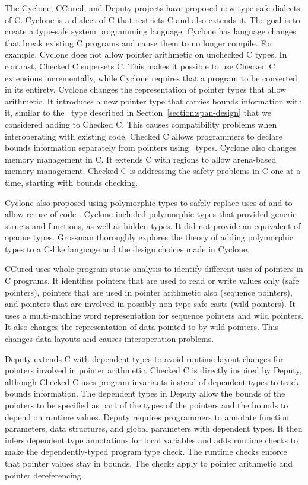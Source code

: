 The Cyclone, CCured, and Deputy projects have proposed new type-safe dialects 
of C.   Cyclone \cite{Jim2002} is a dialect of C that restricts C and also extends it.  The goal is to create a type-safe system programming
language.  Cyclone has language changes that break existing C programs and
cause them to no longer compile.  For example, Cyclone does not allow pointer
arithmetic on unchecked C types.   In contrast, Checked C supersets C. This
makes it possible to use Checked C extensions incrementally, while Cyclone
requires that a program to be converted in its entirety.  Cyclone changes the representation of pointer types that allow arithmetic.  It introduces a new 
pointer type that carries bounds information with it, similar to the \spanptr\
type described in Section~\ref{section:span-design} that we considered adding to Checked C.
This causes  compatibility problems when interoperating with existing
code.   Checked C allows programmers to declare bounds information separately from pointers using \arrayptr\ types.
Cyclone also changes memory management in C.  It extends C with regions
to allow arena-based memory management.  Checked C is addressing the
safety problems in C one at a time, starting with bounds checking. 

Cyclone also proposed using polymorphic types to safely replace 
uses of \uncheckedptrvoid{} and to allow re-use of code \cite{Grossman2006}.  Cyclone
included polymorphic types that provided generic structs and functions, as well as hidden types.  
It did not provide an equivalent of opaque types.  
Grossman \cite{Grossman2006} thoroughly explores the theory of adding polymorphic types
to a C-like language and the design choices made in Cyclone.

CCured \cite{Necula2005} uses whole-program static analysis to identify 
different uses of pointers in C programs. It identifies pointers that are used to
read or write values only (safe pointers), pointers that are used in pointer
arithmetic also (sequence pointers), and pointers that are involved in
possibly non-type safe casts (wild pointers). It uses a multi-machine
word representation for sequence pointers and wild pointers. It also
changes the representation of data pointed to by wild pointers. This
changes data layouts and causes interoperation problems.

Deputy \cite{Condit2007,Feng2006} extends C with dependent types to avoid runtime 
layout changes for pointers involved in pointer arithmetic.  Checked C is directly
inspired by Deputy, although Checked C uses program invariants instead of
dependent types to track bounds information.   The dependent types in Deputy
allow the bounds of
the pointers to be specified as part of the types of the pointers and
the bounds to depend on runtime values. Deputy requires programmers to
annotate function parameters, data structures, and global parameters
with dependent types. It then infers dependent type annotations for
local variables and adds runtime checks to make the dependently-typed
program type check. The runtime checks enforce that pointer values stay
in bounds. The checks apply to pointer arithmetic and pointer
dereferencing.

